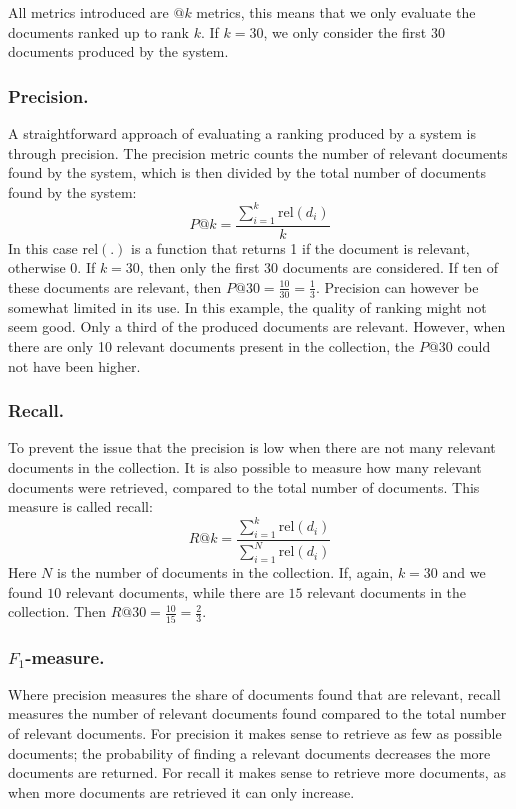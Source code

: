 All metrics introduced are $@k$ metrics, this means that we only evaluate the documents ranked up to rank $k$. If $k=30$, we only consider the first $30$ documents produced by the system.

\subsubsection{Precision.}
A straightforward approach of evaluating a ranking produced by a system is through precision. The precision metric counts the number of relevant documents found by the system, which is then divided by the total number of documents found by the system:
\begin{equation}
	\textit{P}@k = \frac{\sum_{i=1}^k\text{rel}\left(d_i\right)}{k}
\end{equation}
In this case $\text{rel}(.)$ is a function that returns 1 if the document is relevant, otherwise 0.
If $k=30$, then only the first $30$ documents are considered. If ten of these documents are relevant, then $P@30 = \frac{10}{30} = \frac{1}{3}$. Precision can however be somewhat limited in its use. In this example, the quality of ranking might not seem good. Only a third of the produced documents are relevant. However, when there are only 10 relevant documents present in the collection, the $P@30$ could not have been higher. 

\subsubsection{Recall.}
To prevent the issue that the precision is low when there are not many relevant documents in the collection. It is also possible to measure how many relevant documents were retrieved, compared to the total number of documents. This measure is called recall: 
\begin{equation}
	\textit{R}@k = \frac{\sum_{i=1}^k\text{rel}\left(d_i\right)}{\sum_{i=1}^N\text{rel}\left(d_i\right)}
\end{equation}
Here $N$ is the number of documents in the collection. If, again, $k=30$ and we found $10$ relevant documents, while there are $15$ relevant documents in the collection. Then $R@30 = \frac{10}{15} = \frac{2}{3}$.

\subsubsection{$F_1$-measure.}
Where precision measures the share of documents found that are relevant, recall measures the number of relevant documents found compared to the total number of relevant documents. For precision it makes sense to retrieve as few as possible documents; the probability of finding a relevant documents decreases the more documents are returned. For recall it makes sense to retrieve more documents, as when more documents are retrieved it can only increase.  

